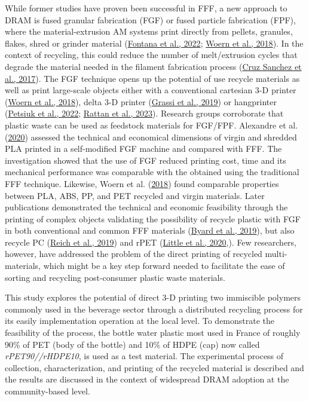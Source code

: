 \documentclass[
  12pt,
]{article}
\begin{document}
While former studies have proven been successful in FFF, a new approach
to DRAM is fused granular fabrication (FGF) or fused particle
fabrication (FPF), where the material-extrusion AM systems print
directly from pellets, granules, flakes, shred or grinder material
(\protect\hyperlink{ref-fontana2022}{Fontana et al., 2022};
\protect\hyperlink{ref-woern2018}{Woern et al., 2018}). In the context
of recycling, this could reduce the number of melt/extrusion cycles that
degrade the material needed in the filament fabrication process
(\protect\hyperlink{ref-cruzsanchez2017}{Cruz Sanchez et al., 2017}).
The FGF technique opens up the potential of use recycle materials as
well as print large-scale objects either with a conventional cartesian
3-D printer (\protect\hyperlink{ref-woern2018}{Woern et al., 2018}),
delta 3-D printer (\protect\hyperlink{ref-grassi2019}{Grassi et al.,
2019}) or hangprinter (\protect\hyperlink{ref-petsiuk2022}{Petsiuk et
al., 2022}; \protect\hyperlink{ref-rattan2023}{Rattan et al., 2023}).
Research groups corroborate that plastic waste can be used as feedstock
materials for FGF/FPF. Alexandre et al.
(\protect\hyperlink{ref-alexandre2020}{2020}) assessed the technical and
economical dimensions of virgin and shredded PLA printed in a
self-modified FGF machine and compared with FFF. The investigation
showed that the use of FGF reduced printing cost, time and its
mechanical performance was comparable with the obtained using the
traditional FFF technique. Likewise, Woern et al.
(\protect\hyperlink{ref-woern2018}{2018}) found comparable properties
between PLA, ABS, PP, and PET recycled and virgin materials. Later
publications demonstrated the technical and economic feasibility through
the printing of complex objects validating the possibility of recycle
plastic with FGF in both conventional and common FFF materials
(\protect\hyperlink{ref-byard2019}{Byard et al., 2019}), but also
recycle PC (\protect\hyperlink{ref-reich2019b}{Reich et al., 2019}) and
rPET (\protect\hyperlink{ref-little2020}{Little et al., 2020},). Few
researchers, however, have addressed the problem of the direct printing
of recycled multi-materials, which might be a key step forward needed to
facilitate the ease of sorting and recycling post-consumer plastic waste
materials.

This study explores the potential of direct 3-D printing two immiscible
polymers commonly used in the beverage sector through a distributed
recycling process for its easily implementation operation at the local
level. To demonstrate the feasibility of the process, the bottle water
plastic most used in France of roughly 90\% of PET (body of the bottle)
and 10\% of HDPE (cap) now called \emph{rPET90//rHDPE10}, is used as a
test material. The experimental process of collection, characterization,
and printing of the recycled material is described and the results are
discussed in the context of widespread DRAM adoption at the
community-based level.
\end{document}
